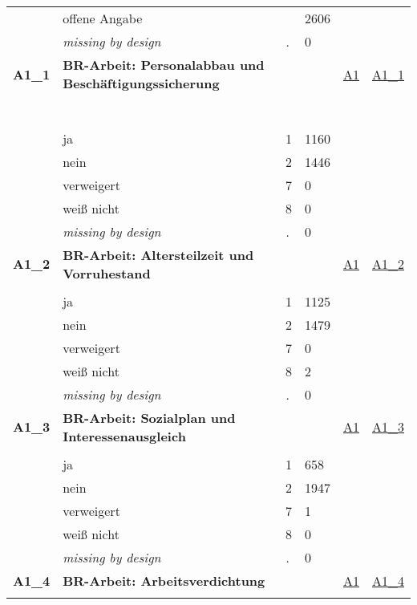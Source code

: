 \begin{longtable}{| L{2.45cm} | L{6cm} | C{1.5cm} | R{1cm} | C{2.25cm} | C{2.25cm} |}
   & offene Angabe &  & 2606 &  &  \\ 
   & \textit{missing by design} & \textit{.} & 0 &  &  \\ 
   \midrule
\textbf{A1\_1}\label{var:A1:1} & \textbf{BR-Arbeit: Personalabbau und Beschäftigungssicherung} &  &  & \hyperref[A1]{A1} & \hyperref[var:suf:A1:1]{A1\_1} \\ 
   & \protect\subsection[Variablen A1\_1 bis A1\_39]{} &  &  &  &  \\ 
   & ja & 1 & 1160 &  &  \\ 
   & nein & 2 & 1446 &  &  \\ 
   & verweigert & 7 & 0 &  &  \\ 
   & weiß nicht & 8 & 0 &  &  \\ 
   & \textit{missing by design} & \textit{.} & 0 &  &  \\ 
   \midrule
\textbf{A1\_2}\label{var:A1:2} & \textbf{BR-Arbeit: Altersteilzeit und Vorruhestand} &  &  & \hyperref[A1]{A1} & \hyperref[var:suf:A1:2]{A1\_2} \\ 
   &  &  &  &  &  \\ 
   & ja & 1 & 1125 &  &  \\ 
   & nein & 2 & 1479 &  &  \\ 
   & verweigert & 7 & 0 &  &  \\ 
   & weiß nicht & 8 & 2 &  &  \\ 
   & \textit{missing by design} & \textit{.} & 0 &  &  \\ 
   \midrule
\textbf{A1\_3}\label{var:A1:3} & \textbf{BR-Arbeit: Sozialplan und Interessenausgleich} &  &  & \hyperref[A1]{A1} & \hyperref[var:suf:A1:3]{A1\_3} \\ 
   &  &  &  &  &  \\ 
   & ja & 1 & 658 &  &  \\ 
   & nein & 2 & 1947 &  &  \\ 
   & verweigert & 7 & 1 &  &  \\ 
   & weiß nicht & 8 & 0 &  &  \\ 
   & \textit{missing by design} & \textit{.} & 0 &  &  \\ 
   \midrule
\textbf{A1\_4}\label{var:A1:4} & \textbf{BR-Arbeit: Arbeitsverdichtung} &  &  & \hyperref[A1]{A1} & \hyperref[var:suf:A1:4]{A1\_4} \\ 
   &  &  &  &  &  \\ 

\end{longtable}
